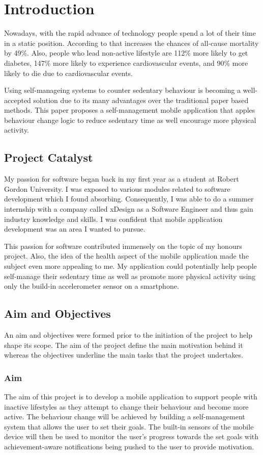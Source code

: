 \chapter{Introduction}
\label{Chapter:Introduction}
Nowadays, with the rapid advance of technology people spend a lot of their time in a static position. According to \citet{wilmot2012} that increases the chances of all-cause mortality by 49\%.  Also, people who lead non-active lifestyle are 112\% more likely to get diabetes, 147\% more likely to experience cardiovascular events, and 90\% more likely to die due to cardiovascular events. 
    
Using self-manageing systems to counter sedentary behaviour is becoming a well-accepted solution due to its many advantages over the traditional paper based methods. This paper proposes a self-management mobile application that apples behaviour change logic to reduce sedentary time as well encourage more physical activity. 
    
    \section{Project Catalyst}
    My passion for software began back in my first year as a student at Robert Gordon University. I was exposed to various modules related to software development which I found absorbing. Consequently, I was able to do a summer internship with a company called xDesign as a Software Engineer and thus gain industry knowledge and skills. I was confident that mobile application development was an area I wanted to pursue. 
    
    This passion for software contributed immensely on the topic of my honours project. Also, the idea of the health aspect of the mobile application made the subject even more appealing to me. My application could potentially help people self-manage their sedentary time as well as promote more physical activity using only the build-in accelerometer sensor on a smartphone. 
    
    
    \section{Aim and Objectives}
    An aim and objectives were formed prior to the initiation of the project to help shape its scope. The aim of the project define the main motivation behind it whereas the objectives underline the main tasks that the project undertakes.
    
    \subsection*{Aim}
    The aim of this project is to develop a mobile application to support people with inactive lifestyles as they attempt to change their behaviour and become more active. The behaviour change will be achieved by building a self-management system that allows the user to set their goals. The built-in sensors of the mobile device will then be used to monitor the user's progress towards the set goals with achievement-aware notifications being pushed to the user to provide motivation.
    
